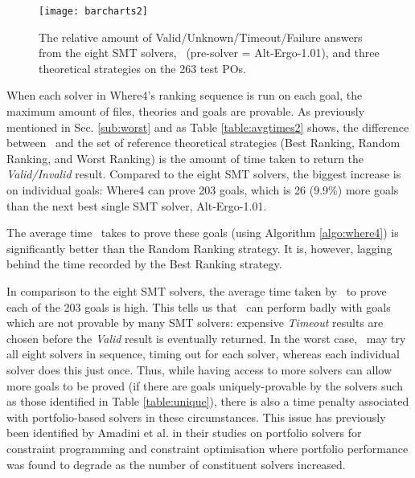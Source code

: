 \begin{figure}
	\centering
	\texttt{[image: barcharts2]}
	\caption[The relative amount of Valid/Unknown/Timeout/Failure answers from the eight SMT solvers, \where, and three theoretical strategies.]{The relative amount of Valid/Unknown/Timeout/Failure answers from the eight SMT solvers, \where~(pre-solver = Alt-Ergo-1.01), and three theoretical strategies on the 263 test POs.}
	\label{fig:barchart2}
\end{figure}


When each solver in \textsf{Where4}'s ranking sequence is run on each goal, the maximum amount of files, theories and goals are provable. 
As previously mentioned in Sec. \ref{sub:worst} and as Table \ref{table:avgtimes2} shows, the difference between \where~and the set of reference theoretical strategies (\textsf{Best Ranking}, \textsf{Random Ranking}, and \textsf{Worst Ranking}) is the amount of time taken to return the \textit{Valid/Invalid} result. 
Compared to the eight SMT solvers, the biggest increase is on individual goals: \textsf{Where4} can prove 203 goals, which is 26 (9.9\%) more goals than the next best single SMT solver, Alt-Ergo-1.01.

The average time \where~takes to prove these goals 
(using Algorithm \ref{algo:where4}) 
is significantly better than the \textsf{Random Ranking} strategy.
It is, however, lagging behind the time recorded by the \textsf{Best Ranking} strategy. 

In comparison to the eight SMT solvers, the average time taken by \where~to prove each of the 203 goals is high. 
This tells us that \where~can perform badly with goals which are not provable by many SMT solvers: expensive \textit{Timeout} results are chosen before the \textit{Valid} result is eventually returned. 
In the worst case, \where~may try all eight solvers in sequence, timing out for each solver, whereas each individual solver does this just once. 
Thus, while having access to more solvers can allow more goals to be proved (if there are goals uniquely-provable by the solvers such as those identified in Table \ref{table:unique}), there is also a time penalty associated with portfolio-based solvers in these circumstances.
This issue has previously been identified by Amadini et al. in their studies on portfolio solvers for constraint programming \cite{Amadini2013} and constraint optimisation \cite{Amadini2016} where portfolio performance was found to degrade as the number of constituent solvers increased.

